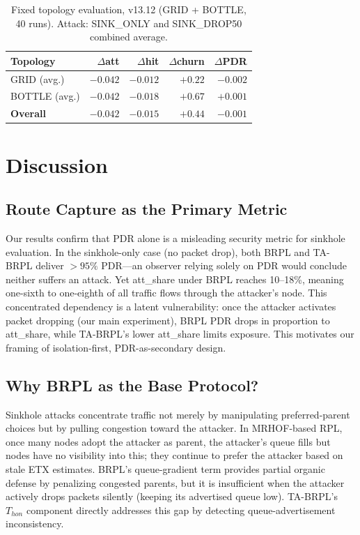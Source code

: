 \documentclass[conference]{IEEEtran}
\begin{document}
\begin{table}[t]
\centering
\caption{Fixed topology evaluation, v13.12 (GRID + BOTTLE, 40 runs).
  Attack: SINK\_ONLY and SINK\_DROP50 combined average.}
\label{tab:fixed}
\footnotesize
\begin{tabular}{lrrrr}
\toprule
Topology & $\Delta$att & $\Delta$hit & $\Delta$churn & $\Delta$PDR \\
\midrule
GRID (avg.)    & $-0.042$ & $-0.012$ & $+0.22$ & $-0.002$ \\
BOTTLE (avg.)  & $-0.042$ & $-0.018$ & $+0.67$ & $+0.001$ \\
\textbf{Overall} & $-0.042$ & $-0.015$ & $+0.44$ & $-0.001$ \\
\bottomrule
\end{tabular}
\end{table}

\section{Discussion}
\label{sec:discussion}

\subsection{Route Capture as the Primary Metric}

Our results confirm that PDR alone is a misleading security metric
for sinkhole evaluation.
In the sinkhole-only case (no packet drop),
both BRPL and TA-BRPL deliver $> 95\%$ PDR---an observer relying solely
on PDR would conclude neither suffers an attack.
Yet att\_share under BRPL reaches 10--18\%, meaning one-sixth to
one-eighth of all traffic flows through the attacker's node.
This concentrated dependency is a latent vulnerability:
once the attacker activates packet dropping (our main experiment),
BRPL PDR drops in proportion to att\_share,
while TA-BRPL's lower att\_share limits exposure.
This motivates our framing of isolation-first,
PDR-as-secondary design.

\subsection{Why BRPL as the Base Protocol?}

Sinkhole attacks concentrate traffic not merely by manipulating
preferred-parent choices but by pulling congestion toward the attacker.
In MRHOF-based RPL, once many nodes adopt the attacker as parent,
the attacker's queue fills but nodes have no visibility into this;
they continue to prefer the attacker based on stale ETX estimates.
BRPL's queue-gradient term provides partial organic defense
by penalizing congested parents, but it is insufficient when the attacker
actively drops packets silently (keeping its advertised queue low).
TA-BRPL's $T_{hon}$ component directly addresses this gap by detecting
queue-advertisement inconsistency.
\end{document}
